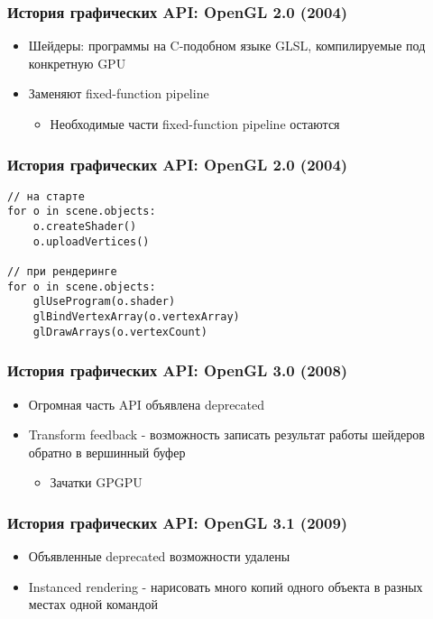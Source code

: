 \documentclass{beamer}
\begin{document}
\begin{frame}
\frametitle{История графических API: OpenGL 2.0 (2004)}
\begin{itemize}
\item Шейдеры: программы на C-подобном языке GLSL, компилируемые под конкретную GPU
\item Заменяют fixed-function pipeline
\begin{itemize}
\item Необходимые части fixed-function pipeline остаются
\end{itemize}
\end{itemize}
\end{frame}

\begin{frame}[fragile]
\frametitle{История графических API: OpenGL 2.0 (2004)}
\begin{verbatim}
// на старте
for o in scene.objects:
    o.createShader()
    o.uploadVertices()

// при рендеринге
for o in scene.objects:
    glUseProgram(o.shader)
    glBindVertexArray(o.vertexArray)
    glDrawArrays(o.vertexCount)
\end{verbatim}
\end{frame}

\begin{frame}
\frametitle{История графических API: OpenGL 3.0 (2008)}
\begin{itemize}
\item Огромная часть API объявлена deprecated
\pause
\item Transform feedback - возможность записать результат работы шейдеров обратно в вершинный буфер
\begin{itemize}
\item Зачатки GPGPU
\end{itemize}
\end{itemize}
\end{frame}

\begin{frame}
\frametitle{История графических API: OpenGL 3.1 (2009)}
\begin{itemize}
\item Объявленные deprecated возможности удалены
\pause
\item Instanced rendering - нарисовать много копий одного объекта в разных местах одной командой
\end{itemize}
\end{frame}
\end{document}
